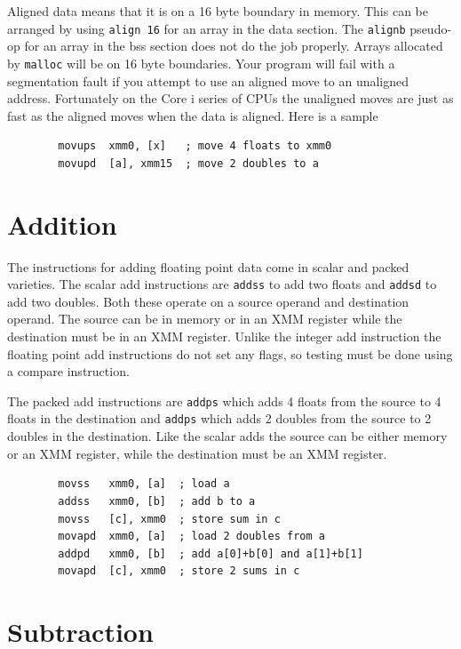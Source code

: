 \documentclass[11pt,b5paper]{book}
\begin{document}
Aligned data means that it is on a 16 byte boundary in memory.
This can be arranged by using {\tt align 16} for an array in the data section.
The {\tt alignb} pseudo-op for an array in the bss section does not do the job properly.
Arrays allocated by {\tt malloc} will be on 16 byte boundaries.
Your program will fail with a segmentation fault if you attempt to use an aligned move to an unaligned address.
Fortunately on the Core i series of CPUs the unaligned moves are just as fast
as the aligned moves when the data is aligned.
Here is a sample
\begin{verbatim}
        movups  xmm0, [x]   ; move 4 floats to xmm0
        movupd  [a], xmm15  ; move 2 doubles to a
\end{verbatim}

\section{Addition}

The instructions for adding floating point data come in scalar and packed varieties.
The scalar add instructions are {\tt addss} to add two floats and
{\tt addsd} to add two doubles.
Both these operate on a source operand and destination operand.
The source can be in memory or in an XMM register while the destination must be in
an XMM register.
Unlike the integer add instruction the floating point add instructions do not set any flags,
so testing must be done using a compare instruction.

The packed add instructions are {\tt addps} which adds 4 floats from the source to 4 floats
in the destination and {\tt addps} which adds 2 doubles from the source to 2 doubles in the
destination.
Like the scalar adds the source can be either memory or an XMM register, while the destination
must be an XMM register.

\begin{verbatim}
        movss   xmm0, [a]  ; load a
        addss   xmm0, [b]  ; add b to a
        movss   [c], xmm0  ; store sum in c
        movapd  xmm0, [a]  ; load 2 doubles from a
        addpd   xmm0, [b]  ; add a[0]+b[0] and a[1]+b[1]
        movapd  [c], xmm0  ; store 2 sums in c
\end{verbatim}



\section{Subtraction}
\end{document}
